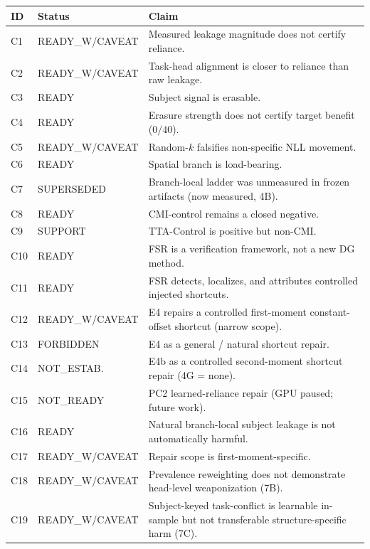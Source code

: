 \begin{tabular}{llp{6.9cm}}
\toprule
ID & Status & Claim \\
\midrule
C1 & READY\_W/CAVEAT & Measured leakage magnitude does not certify reliance. \\
C2 & READY\_W/CAVEAT & Task-head alignment is closer to reliance than raw leakage. \\
C3 & READY & Subject signal is erasable. \\
C4 & READY & Erasure strength does not certify target benefit ($0/40$). \\
C5 & READY\_W/CAVEAT & Random-$k$ falsifies non-specific NLL movement. \\
C6 & READY & Spatial branch is load-bearing. \\
C7 & SUPERSEDED & Branch-local ladder was unmeasured in frozen artifacts (now measured, 4B). \\
C8 & READY & CMI-control remains a closed negative. \\
C9 & SUPPORT & TTA-Control is positive but non-CMI. \\
C10 & READY & FSR is a verification framework, not a new DG method. \\
C11 & READY & FSR detects, localizes, and attributes controlled injected shortcuts. \\
C12 & READY\_W/CAVEAT & E4 repairs a controlled first-moment constant-offset shortcut (narrow scope). \\
C13 & FORBIDDEN & E4 as a general / natural shortcut repair. \\
C14 & NOT\_ESTAB. & E4b as a controlled second-moment shortcut repair (4G = none). \\
C15 & NOT\_READY & PC2 learned-reliance repair (GPU paused; future work). \\
C16 & READY & Natural branch-local subject leakage is not automatically harmful. \\
C17 & READY\_W/CAVEAT & Repair scope is first-moment-specific. \\
C18 & READY\_W/CAVEAT & Prevalence reweighting does not demonstrate head-level weaponization (7B). \\
C19 & READY\_W/CAVEAT & Subject-keyed task-conflict is learnable in-sample but not transferable structure-specific harm (7C). \\
\bottomrule
\end{tabular}
